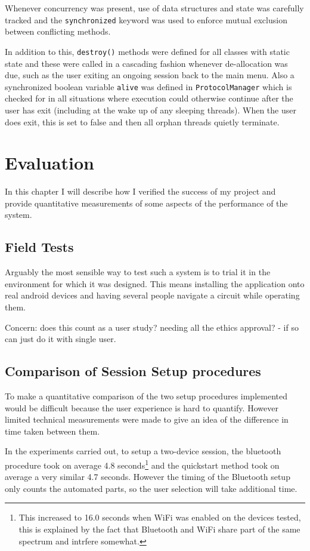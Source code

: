 Whenever concurrency was present, use of data structures and state was carefully tracked and the {\tt synchronized} keyword was used to enforce mutual exclusion between conflicting methods.

In addition to this, {\tt destroy()} methods were defined for all classes with static state and these were called in a cascading fashion whenever de-allocation was due, such as the user exiting an ongoing session back to the main menu. Also a synchronized boolean variable {\tt alive} was defined in {\tt ProtocolManager} which is checked for in all situations where execution could otherwise continue after the user has exit (including at the wake up of any sleeping threads). When the user does exit, this is set to false and then all orphan threads quietly terminate.

\cleardoublepage
\chapter{Evaluation}
\label{eval}

In this chapter I will describe how I verified the success of my project and provide quantitative measurements of some aspects of the performance of the system.

\section{Field Tests}

Arguably the most sensible way to test such a system is to trial it in the environment for which it was designed. This means installing the application onto real android devices and having several people navigate a circuit while operating them.

Concern: does this count as a user study? needing all the ethics approval? - if so can just do it with single user.

\section{Comparison of Session Setup procedures}

To make a quantitative comparison of the two setup procedures implemented would be difficult because the user experience is hard to quantify. However limited technical measurements were made to give an idea of the difference in time taken between them.

In the experiments carried out, to setup a two-device session, the bluetooth procedure took on average 4.8 seconds\footnote{This increased to 16.0 seconds when WiFi was enabled on the devices tested, this is explained by the fact that Bluetooth and WiFi share part of the same spectrum and intrfere somewhat.\cite{btwifi}} and the quickstart method took on average a very similar 4.7 seconds. However the timing of the Bluetooth setup only counts the automated parts, so the user selection will take additional time.

